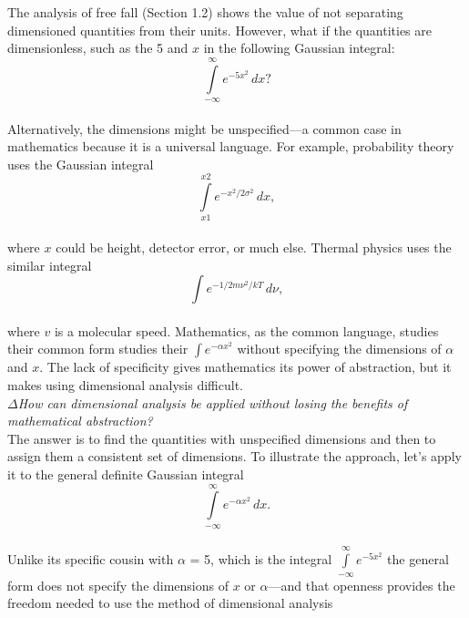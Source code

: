 \documentclass[a4paper]{article}
\begin{document}
The analysis of free fall (Section 1.2) shows the value of not separating
dimensioned quantities from their units. However, what if the quantities
are dimensionless, such as the 5 and $x$ in the following Gaussian integral:
\\

\begin{equation}
\int\limits_{-\infty}^{\infty} e^{-5x^2}\,dx?
\end{equation}
\\
Alternatively, the dimensions might be unspecified—a common case in
mathematics because it is a universal language. For example, probability
theory uses the Gaussian integral
\\

\begin{equation}
\int\limits_{x1}^{x2} e^{-x^2/2\sigma^2}\,dx,
\end{equation}
\\
where $x$ could be height, detector error, or much else. Thermal physics
uses the similar integral
\\

\begin{equation}
\int e^{-1/2m\nu^2/kT}\,d\nu,
\end{equation}
\\
where $v$ is a molecular speed. Mathematics, as the common language,
studies their common form studies their $\int e^{-\alpha x^2}$ without specifying the dimensions of
$\alpha$ and $x$. The lack of specificity gives mathematics its power of abstraction,
but it makes using dimensional analysis difficult.
\\

$\Delta$\textit {How can dimensional analysis be applied without losing the benefits of mathematical
abstraction?}
\\

The answer is to find the quantities with unspecified dimensions and then
to assign them a consistent set of dimensions. To illustrate the approach,
let’s apply it to the general definite Gaussian integral
\\

\begin{equation}
\int\limits_{-\infty}^{\infty} e^{-\alpha x^2}\,dx.
\end{equation}
\\
Unlike its specific cousin with $\alpha$ = 5, which is the integral $\int\limits_{-\infty}^{\infty} e^{-5x^2}$ the general form does not specify the dimensions of $x$ or $\alpha$—and that
openness provides the freedom needed to use the method of dimensional
analysis
\\
\end{document}
